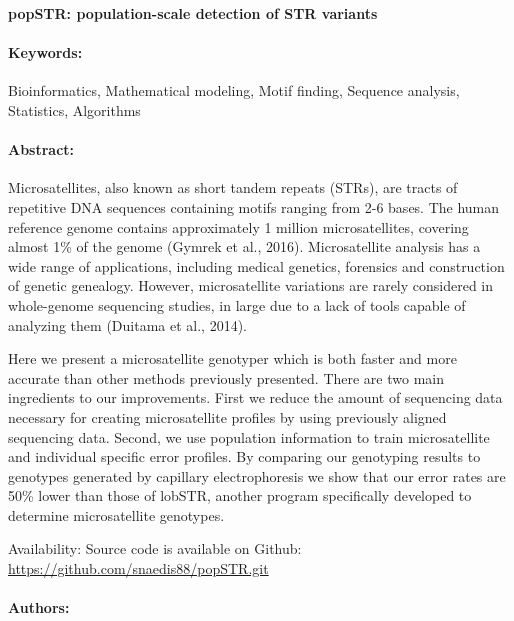 \documentclass[11pt]{article}
\date{}
\author{}
\begin{document}
\noindent
\large {\bf popSTR: population-scale detection of STR variants} 


\normalsize 


\noindent \paragraph{Keywords:} Bioinformatics, Mathematical modeling, Motif finding, Sequence analysis,
Statistics, Algorithms

\noindent \paragraph{Abstract:} 

Microsatellites, also known as short tandem repeats (STRs), are tracts of repetitive
DNA sequences containing motifs ranging from 2-6 bases. The human reference genome contains
approximately 1 million microsatellites, covering almost 1\% of the genome (Gymrek et al., 2016).
Microsatellite analysis has a wide range of applications, including medical genetics, forensics and
construction of genetic genealogy. However, microsatellite variations are rarely considered in whole-genome
 sequencing studies, in large due to a lack of tools capable of analyzing them (Duitama et al., 2014).

 Here we present a microsatellite genotyper which is both faster and more accurate than other
methods previously presented. There are two main ingredients to our improvements. First we reduce
the amount of sequencing data necessary for creating microsatellite profiles by using previously aligned
sequencing data. Second, we use population information to train microsatellite and individual specific
error profiles. By comparing our genotyping results to genotypes generated by capillary electrophoresis
we show that our error rates are 50\% lower than those of lobSTR, another program specifically developed
to determine microsatellite genotypes.

Availability: Source code is available on Github: \url{https://github.com/snaedis88/popSTR.git}

\noindent \paragraph{Authors:} 

\noindent \paragraph{} 
\end{document}
